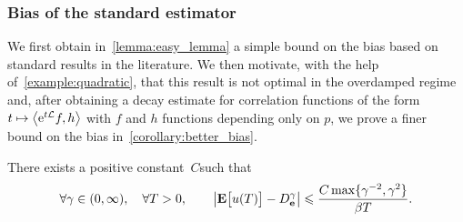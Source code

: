 \documentclass[11pt,a4paper]{article}
\begin{document}
\subsubsection{Bias of the standard estimator}%
\label{ssub:bias_of_the_standard_estimator}

We first obtain in~\cref{lemma:easy_lemma} a simple bound on the bias based on standard results in the literature.
We then motivate, with the help of~\cref{example:quadratic},
that this result is not optimal in the overdamped regime and,
after obtaining a decay estimate for correlation functions of the form $t \mapsto \ip{\e^{t \mathcal L} f}{h}$ with $f$ and $h$ functions depending only on $p$,
we prove a finer bound on the bias in~\cref{corollary:better_bias}.

\begin{lemma}
    \label{lemma:easy_lemma}
    There exists a positive constant~$C$such that
    \begin{equation}
        \label{eq:bias_simple}
        \forall \gamma \in (0, \infty),
        \quad
        \forall T > 0,
        \qquad
        \abs{\expect \bigl[u(T)\bigr] - D_{\vect e}^{\gamma}}
        \leq
        \frac{C \max \{\gamma^{-2}, \gamma^2\}}{\beta T}.
    \end{equation}
\end{lemma}
\end{document}

